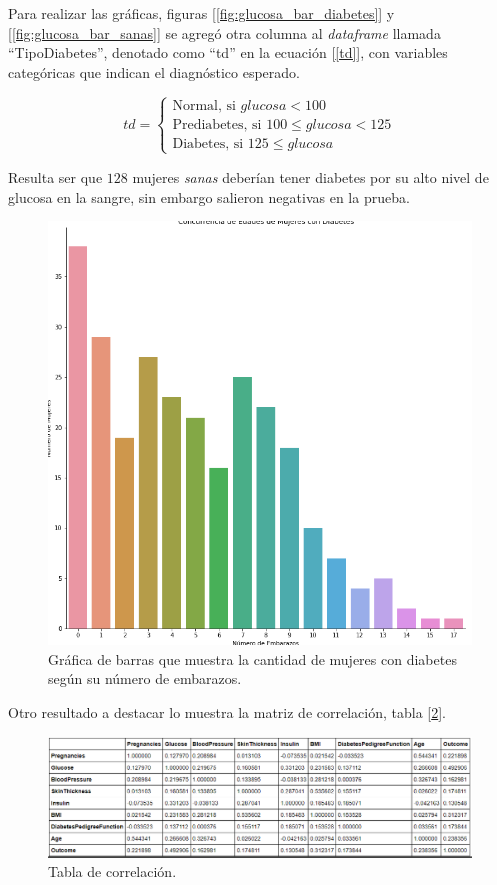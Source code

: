 \documentclass{article}
\begin{document}
Para realizar las gráficas, figuras [\ref{fig:glucosa_bar_diabetes}] y [\ref{fig:glucosa_bar_sanas}] se agregó otra columna al \emph{dataframe} llamada ``TipoDiabetes'', denotado como ``td'' en la ecuación [\ref{td}], con variables categóricas que indican el diagnóstico esperado.

\begin{equation}\label{td}
	td=
	\begin{cases}
		\text{Normal, si      } glucosa < 100\\
		\text{Prediabetes, si   } 100 \leq glucosa < 125\\
		\text{Diabetes, si  } 125 \leq glucosa
	\end{cases}
\end{equation}

Resulta ser que $128$ mujeres \emph{sanas} deberían tener diabetes por su alto nivel de glucosa en la sangre, sin embargo salieron negativas en la prueba.

\begin{figure}[H]
	\centering
	\includegraphics[width=0.65\linewidth]{emb_diabetes.png}
	\caption{Gráfica de barras que muestra la cantidad de mujeres con diabetes según su número de embarazos.}%
	\label{fig:emb_diabetes}
\end{figure}

Otro resultado a destacar lo muestra la matriz de correlación, tabla [\ref{fig:corr}].

\begin{figure}[H]
	\centering
	\includegraphics[width=0.9\linewidth]{corr.png}
	\caption{Tabla de correlación.}%
	\label{fig:corr}
\end{figure}
\end{document}
